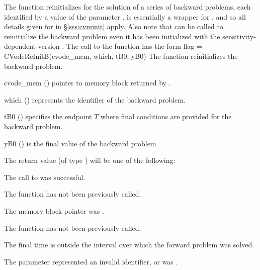 The function  reinitializes {\cvodes} for the solution of a series
of backward problems, each identified by a value of the parameter .
 is essentially a wrapper for , and so
all details given for  in \S\ref{sss:cvreinit}
apply.  Also note that  can be called to
reinitialize the backward problem even it has been initialized with the
sensitivity-dependent version .
The call to the  function has the form
{
  flag = CVodeReInitB(cvode\_mem, which, tB0, yB0)
}
{
  The function  reinitializes {\cvodes} the backward problem.
}
{
  \begin{args}
  \item[cvode\_mem] ()
    pointer to {\cvodes} memory block returned by .
  \item[which] ()
    represents the identifier of the backward problem.
  \item[tB0] ()
    specifies the endpoint $T$ where final conditions are provided for the 
    backward problem.
  \item[yB0] ()
    is the final value of the backward problem. 
  \end{args}
}
{
  The return value  (of type ) will be one of the following:
  \begin{args}
  \item[\Id{CV\_SUCCESS}]
    The call to  was successful.
  \item[\Id{CV\_NO\_MALLOC}]
    The function  has not been previously called.
  \item[\Id{CV\_MEM\_NULL}] 
    The  memory block pointer was .
  \item[\Id{CV\_NO\_ADJ}]
    The function  has not been previously called.
  \item[\Id{CV\_BAD\_TB0}]
    The final time  is outside the interval over which the forward problem
    was solved.
  \item[\Id{CV\_ILL\_INPUT}]
    The parameter  represented an invalid identifier, or
     was .
  \end{args}
}
{}

